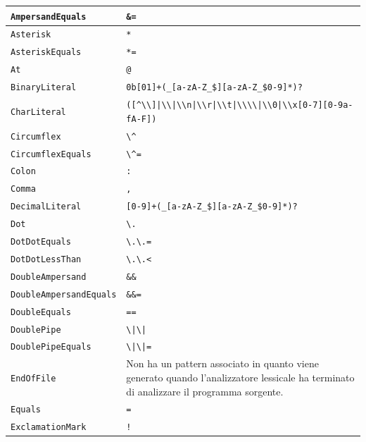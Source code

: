 \begin{xltabular}{\textwidth}{l|X}
	\texttt{AmpersandEquals} & \texttt{\&=} \\ \hline
	\texttt{Asterisk} & \texttt{*} \\ \hline
	\texttt{AsteriskEquals} & \texttt{*=} \\ \hline
	\texttt{At} & \texttt{@} \\ \hline
	\texttt{BinaryLiteral} & \texttt{0b[01]+(\_[a-zA-Z\_\$][a-zA-Z\_\$0-9]*)?}  \\ \hline
	\texttt{CharLiteral} & \texttt{\textquotesingle([\textasciicircum \textquotesingle \textbackslash \textbackslash]|\textbackslash \textbackslash \textquotesingle |\textbackslash \textbackslash n|\textbackslash \textbackslash r|\textbackslash \textbackslash t|\textbackslash\textbackslash\textbackslash\textbackslash|\textbackslash \textbackslash 0|\textbackslash \textbackslash x[0-7][0-9a-fA-F])\textquotesingle} \\ \hline
	\texttt{Circumflex} & \texttt{\textbackslash\textasciicircum} \\ \hline
	\texttt{CircumflexEquals} & \texttt{\textbackslash\textasciicircum=} \\ \hline
	\texttt{Colon} & \texttt{:} \\ \hline
	\texttt{Comma} & \texttt{,} \\ \hline
	\texttt{DecimalLiteral} & \texttt{[0-9]+(\_[a-zA-Z\_\$][a-zA-Z\_\$0-9]*)?} \\ \hline
	\texttt{Dot} & \texttt{\textbackslash .} \\ \hline
	\texttt{DotDotEquals} & \texttt{\textbackslash .\textbackslash .=} \\ \hline
	\texttt{DotDotLessThan} & \texttt{\textbackslash .\textbackslash .<} \\ \hline
	\texttt{DoubleAmpersand} & \texttt{\&\&} \\ \hline
	\texttt{DoubleAmpersandEquals} & \texttt{\&\&=} \\ \hline
	\texttt{DoubleEquals} & \texttt{==} \\ \hline
	\texttt{DoublePipe} & \texttt{\textbackslash |\textbackslash |} \\ \hline
	\texttt{DoublePipeEquals} & \texttt{\textbackslash |\textbackslash |=} \\ \hline
	\texttt{EndOfFile} & Non ha un pattern associato in quanto viene generato quando l'analizzatore lessicale ha terminato di analizzare il programma sorgente. \\ \hline
	\texttt{Equals} & \texttt{=} \\ \hline
	\texttt{ExclamationMark} & \texttt{!} \\ \hline

\end{xltabular}
